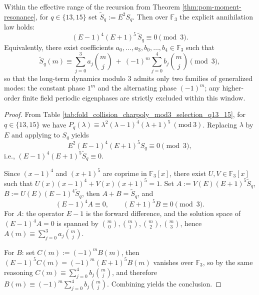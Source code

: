 \begin{proposition}[Two-phase compression modulo \texorpdfstring{$3$}{3}: for \texorpdfstring{$q=13,15$}{q=13,15} only the \texorpdfstring{$1$}{1} and \texorpdfstring{$-1$}{-1} generalized phases survive]\label{prop:pom-moment-mod3-two-phase}
Within the effective range of the recursion from Theorem \ref{thm:pom-moment-resonance}, for \(q\in\{13,15\}\) set
\(
\widetilde S_q:=E^2S_q
\).
Then over \(\mathbb{F}_3\) the explicit annihilation law holds:
\[
(E-1)^4(E+1)^5\,\widetilde S_q\equiv 0\pmod 3.
\]
Equivalently, there exist coefficients \(a_0,\dots,a_3,b_0,\dots,b_4\in\mathbb{F}_3\) such that
\[
\widetilde S_q(m)\equiv
\sum_{j=0}^{3}a_j\binom{m}{j}
\ +\
(-1)^m\sum_{j=0}^{4}b_j\binom{m}{j}
\pmod 3,
\]
so that the long-term dynamics modulo \(3\) admits only two families of generalized modes: the constant phase \(1^m\) and the alternating phase \((-1)^m\); any higher-order finite field periodic eigenphases are strictly excluded within this window.
\end{proposition}
\begin{proof}
From Table \ref{tab:fold_collision_charpoly_mod3_selection_q13_15}, for \(q\in\{13,15\}\) we have
\(
P_q(\lambda)\equiv \lambda^2(\lambda-1)^4(\lambda+1)^5\ (\mathrm{mod}\ 3)
\).
Replacing \(\lambda\) by \(E\) and applying to \(S_q\) yields
\[
E^2(E-1)^4(E+1)^5S_q\equiv 0\pmod 3,
\]
i.e., \((E-1)^4(E+1)^5\widetilde S_q\equiv 0\).
\par
Since \((x-1)^4\) and \((x+1)^5\) are coprime in \(\mathbb{F}_3[x]\), there exist \(U,V\in\mathbb{F}_3[x]\) such that
\(
U(x)(x-1)^4+V(x)(x+1)^5=1
\).
Set
\(
A:=V(E)(E+1)^5\widetilde S_q
\),
\(
B:=U(E)(E-1)^4\widetilde S_q
\),
then \(A+B=\widetilde S_q\), and
\[
(E-1)^4A\equiv 0,\qquad (E+1)^5B\equiv 0\pmod 3.
\]
For \(A\): the operator \(E-1\) is the forward difference, and the solution space of \((E-1)^4A=0\) is spanned by
\(
\binom{m}{0},\binom{m}{1},\binom{m}{2},\binom{m}{3}
\),
hence \(A(m)\equiv \sum_{j=0}^3 a_j\binom{m}{j}\).
\par
For \(B\): set \(C(m):=(-1)^mB(m)\), then
\(
(E-1)^5C(m)=(-1)^m(E+1)^5B(m)
\)
vanishes over \(\mathbb{F}_3\), so by the same reasoning
\(
C(m)\equiv \sum_{j=0}^4 b_j\binom{m}{j}
\),
and therefore \(B(m)\equiv (-1)^m\sum_{j=0}^4 b_j\binom{m}{j}\).
Combining yields the conclusion.
\end{proof}

